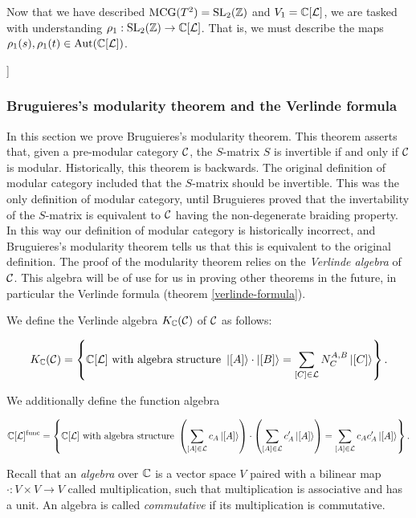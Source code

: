 Now that we have described $\operatorname{MCG}(T^2)=\operatorname{SL}_2({\mathbb Z})$ and $V_1={\mathbb C}[{\mathcal L}]$, we are tasked with understanding $\rho_1:\operatorname{SL}_2({\mathbb Z})\to {\mathbb C}[{\mathcal L}]$. That is, we must describe the maps $\rho_1(s),\rho_1(t)\in \operatorname{Aut}({\mathbb C}[{\mathcal L}])$.


]

\subsubsection{Bruguieres's modularity theorem and the Verlinde formula}

In this section we prove Bruguieres's modularity theorem. This theorem asserts that, given a pre-modular category ${\mathcal C}$, the $S$-matrix $S$ is invertible if and only if ${\mathcal C}$ is modular. Historically, this theorem is backwards. The original definition of modular category included that the $S$-matrix should be invertible. This was the only definition of modular category, until Bruguieres proved \cite{bruguieres2000categories} that the invertability of the $S$-matrix is equivalent to ${\mathcal C}$ having the non-degenerate braiding property. In this way our definition of modular category is historically incorrect, and Bruguieres's modularity theorem tells us that this is equivalent to the original definition. The proof of the modularity theorem relies on the {\em Verlinde algebra} of ${\mathcal C}$. This algebra will be of use for us in proving other theorems in the future, in particular the Verlinde formula (theorem \ref{verlinde-formula}).

\begin{defn}

We define the Verlinde algebra $K_{{\mathbb C}}({\mathcal C})$ of ${\mathcal C}$ as follows:

$$K_{{\mathbb C}}({\mathcal C})=
\left\{
{\mathbb C}[{\mathcal L}] \text{ with algebra structure }
\ket{[A]}\cdot \ket{[B]}=\sum_{[C]\in {\mathcal L}}N^{A,B}_{C}\ket{[C]}
\right\}.$$

We additionally define the function algebra

$$
{\mathbb C}[{\mathcal L}]^{\text{func}}=
\left\{
{\mathbb C}[{\mathcal L}] \text{ with algebra structure }
\left(\sum_{[A]\in {\mathcal L}}c_A \ket{[A]}\right)\cdot \left(\sum_{[A]\in {\mathcal L}}c_A' \ket{[A]}\right)= \sum_{[A]\in {\mathcal L}}c_A c_A' \ket{[A]}
\right\}.
$$

Recall that an {\em algebra} over ${\mathbb C}$ is a vector space $V$ paired with a bilinear map $\cdot: V\times V\to V$ called multiplication, such that multiplication is associative and has a unit. An algebra is called {\em commutative} if its multiplication is commutative.
\end{defn}

